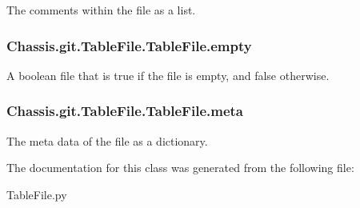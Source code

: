 The comments within the file as a list. 

\hypertarget{class_chassis_8git_1_1_table_file_1_1_table_file_a66e76dcc336121d349353714572e7d88}{
\subsubsection[{empty}]{\setlength{\rightskip}{0pt plus 5cm}Chassis.\-git.\-Table\-File.\-Table\-File.\-empty}}\label{class_chassis_8git_1_1_table_file_1_1_table_file_a66e76dcc336121d349353714572e7d88}


A boolean file that is true if the file is empty, and false otherwise. 

\hypertarget{class_chassis_8git_1_1_table_file_1_1_table_file_ac5ef6c165fa0c10b2fb7b59cb2b5158c}{
\subsubsection[{meta}]{\setlength{\rightskip}{0pt plus 5cm}Chassis.\-git.\-Table\-File.\-Table\-File.\-meta}}\label{class_chassis_8git_1_1_table_file_1_1_table_file_ac5ef6c165fa0c10b2fb7b59cb2b5158c}


The meta data of the file as a dictionary. 



The documentation for this class was generated from the following file\-:\begin{DoxyCompactItemize}
\item 
Table\-File.\-py\end{DoxyCompactItemize}
